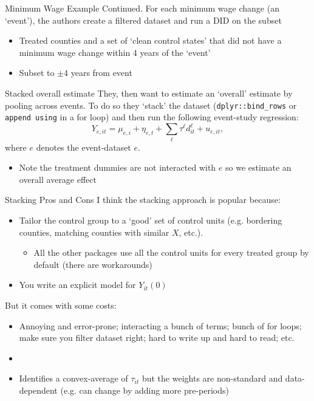 \documentclass[t]{beamer}
\begin{document}
\begin{frame}{Minimum Wage Example Continued.}
  \bigskip
  For each minimum wage change (an `event'), the authors create a filtered dataset and run a DID on the subset
  \begin{itemize}
    \item Treated counties and a set of `clean control states' that did not have a minimum wage change within 4 years of the `event'
    \item Subset to $\pm 4$ years from event
  \end{itemize}
\end{frame}


\begin{frame}{Stacked overall estimate}
  They, then want to estimate an `overall' estimate by pooling across events. To do so they `stack' the dataset (\texttt{dplyr::bind\_rows} or \texttt{append using} in a for loop) and then run the following event-study regression:
  $$
    Y_{e,it} = \mu_{e,i} + \eta_{e,t} + \sum_{\ell} \tau^\ell d_{it}^\ell + u_{e,it},
  $$
  where $e$ denotes the event-dataset $e$.
  \begin{itemize}
    \item Note the treatment dummies are not interacted with $e$ so we estimate an overall average effect
  \end{itemize}
\end{frame}

\begin{frame}{Stacking Pros and Cons}
  I think the stacking approach is popular because:
  \begin{itemize}
    \item Tailor the control group to a `good' set of control units (e.g. bordering counties, matching counties with similar $X$, etc.).
    \begin{itemize}
      \item All the other packages use all the control units for every treated group by default (there are workarounds)
    \end{itemize}

    \item You write an explicit model for $Y_{it}(0)$
  \end{itemize}

  \bigskip
  But it comes with some costs:
  \begin{itemize}
    \item Annoying and error-prone; interacting a bunch of terms; bunch of for loops; make sure you filter dataset right; hard to write up and hard to read; etc.
    \item 
    \item Identifies a convex-average of $\tau_{it}$ but the weights are non-standard and data-dependent (e.g. can change by adding more pre-periods)
  \end{itemize}
\end{frame}
\end{document}
